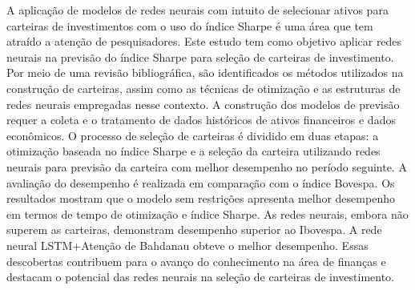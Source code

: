 A aplicação de modelos de redes neurais com intuito de selecionar ativos para carteiras de investimentos com o uso do índice Sharpe é uma área que tem atraído a atenção de pesquisadores. Este estudo tem como objetivo aplicar redes neurais na previsão do índice Sharpe para seleção de carteiras de investimento. Por meio de uma revisão bibliográfica, são identificados os métodos utilizados na construção de carteiras, assim como as técnicas de otimização e as estruturas de redes neurais empregadas nesse contexto. A construção dos modelos de previsão requer a coleta e o tratamento de dados históricos de ativos financeiros e dados econômicos. O processo de seleção de carteiras é dividido em duas etapas: a otimização baseada no índice Sharpe e a seleção da carteira utilizando redes neurais para previsão da carteira com melhor desempenho no período seguinte. A avaliação do desempenho é realizada em comparação com o índice Bovespa. Os resultados mostram que o modelo sem restrições apresenta melhor desempenho em termos de tempo de otimização e índice Sharpe. As redes neurais, embora não superem as carteiras, demonstram desempenho superior ao Ibovespa. A rede neural LSTM+Atenção de Bahdanau obteve o melhor desempenho. Essas descobertas contribuem para o avanço do conhecimento na área de finanças e destacam o potencial das redes neurais na seleção de carteiras de investimento.